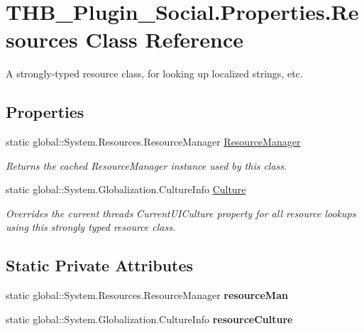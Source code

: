\hypertarget{class_t_h_b___plugin___social_1_1_properties_1_1_resources}{}\section{T\+H\+B\+\_\+\+Plugin\+\_\+\+Social.\+Properties.\+Resources Class Reference}
\label{class_t_h_b___plugin___social_1_1_properties_1_1_resources}


A strongly-\/typed resource class, for looking up localized strings, etc.  


\subsection*{Properties}
\begin{DoxyCompactItemize}
\item 
static global\+::\+System.\+Resources.\+Resource\+Manager \mbox{\hyperlink{class_t_h_b___plugin___social_1_1_properties_1_1_resources_a480b09e333fe9a3de46ecf95895fdde8}{Resource\+Manager}}
\begin{DoxyCompactList}\small\item\em Returns the cached Resource\+Manager instance used by this class. \end{DoxyCompactList}\item 
static global\+::\+System.\+Globalization.\+Culture\+Info \mbox{\hyperlink{class_t_h_b___plugin___social_1_1_properties_1_1_resources_a4b1ade895a2309c9b4020346f8ed51c3}{Culture}}
\begin{DoxyCompactList}\small\item\em Overrides the current thread\textquotesingle{}s Current\+U\+I\+Culture property for all resource lookups using this strongly typed resource class. \end{DoxyCompactList}\end{DoxyCompactItemize}
\subsection*{Static Private Attributes}
\begin{DoxyCompactItemize}
\item 
\mbox{\label{class_t_h_b___plugin___social_1_1_properties_1_1_resources_a8ff25bc7c1484e726983f36b516c56f7}} 
static global\+::\+System.\+Resources.\+Resource\+Manager {\bfseries resource\+Man}
\item 
\mbox{\label{class_t_h_b___plugin___social_1_1_properties_1_1_resources_af6f06bd4c037c13a9c69e7700a6950b9}} 
static global\+::\+System.\+Globalization.\+Culture\+Info {\bfseries resource\+Culture}
\end{DoxyCompactItemize}



